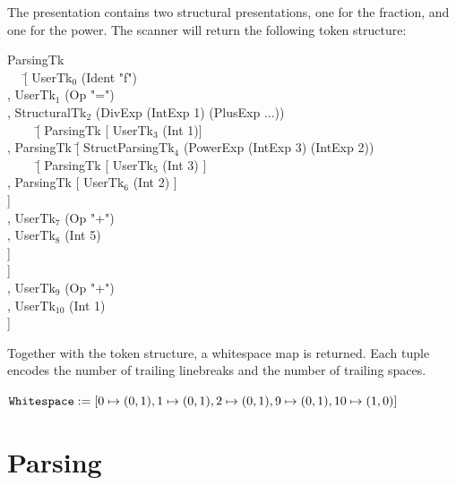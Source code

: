 \documentclass[12pt]{article}
\begin{document}
The presentation contains two structural presentations, one for the fraction, and one for the power. The scanner will return the following token structure: 
\begin{tabbedCode}
ParsingTk \= \\
~~ \= [ UserTk$_0$ (Ident "f") \\
   \> , UserTk$_1$ (Op "=") \\
   \> , StructuralTk$_2$ (DivExp (IntExp 1) (PlusExp ...))\\
   \> ~~~~ \= [ ParsingTk [ UserTk$_3$ (Int 1)] \\
   \>      \> , ParsingTk  \= [ StructParsingTk$_4$ (PowerExp (IntExp 3) (IntExp 2))\\
   \>      \>              \> ~~~~ \= [ ParsingTk [ UserTk$_5$ (Int 3) ] \\
   \>      \>              \>      \> , ParsingTk [ UserTk$_6$ (Int 2) ] \\
   \>      \>              \>      \> ] \\
   \>      \>              \> , UserTk$_7$ (Op "+") \\
   \>      \>              \> , UserTk$_8$ (Int 5) \\
   \>      \>              \> ] \\
   \>      \> ] \\
   \> , UserTk$_9$ (Op "+") \\
   \> , UserTk$_{10}$ (Int 1) \\
   \> ] \\
\end{tabbedCode}


Together with the token structure, a whitespace map is returned. Each tuple encodes the number of trailing linebreaks and the number of trailing spaces. 

\noindent \begin{math}
\texttt{Whitespace}: =[ 0 \mapsto (0,1), 1 \mapsto (0,1), 2 \mapsto (0,1), 9 \mapsto (0,1), 10 \mapsto (1,0) ]
\end{math}




%
\section{Parsing}
%
\end{document}
